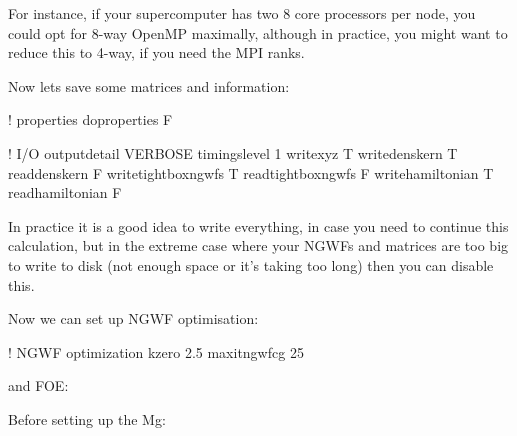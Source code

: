 \documentclass[letterpaper,10pt,english]{sphinxmanual}
\begin{document}
For instance, if your supercomputer has two 8 core processors per node,
you could opt for 8-way OpenMP maximally, although in practice, you
might want to reduce this to 4-way, if you need the MPI ranks.

Now lets save some matrices and information:

%
\begin{sphinxVerbatim}[commandchars=\\\{\}]
! properties
 do\PYGZus{}properties F

! I/O
 output\PYGZus{}detail VERBOSE
 timings\PYGZus{}level 1
 write\PYGZus{}xyz T
 write\PYGZus{}denskern T
 read\PYGZus{}denskern F
 write\PYGZus{}tightbox\PYGZus{}ngwfs T
 read\PYGZus{}tightbox\PYGZus{}ngwfs F
 write\PYGZus{}hamiltonian T
 read\PYGZus{}hamiltonian F
\end{sphinxVerbatim}

In practice it is a good idea to write everything, in case you need to
continue this calculation, but in the extreme case where your NGWFs and
matrices are too big to write to disk (not enough space or it’s taking
too long) then you can disable this.

Now we can set up NGWF optimisation:

%
\begin{sphinxVerbatim}[commandchars=\\\{\}]
! NGWF optimization
 k\PYGZus{}zero 2.5
 maxit\PYGZus{}ngwf\PYGZus{}cg 25
\end{sphinxVerbatim}

and FOE:

%
\begin{sphinxVerbatim}[commandchars=\\\{\}]
  
  
  
\end{sphinxVerbatim}

Before setting up the Mg:

%
\begin{sphinxVerbatim}[commandchars=\\\{\}]
 
     
 

 
 
 
\end{sphinxVerbatim}
\end{document}
